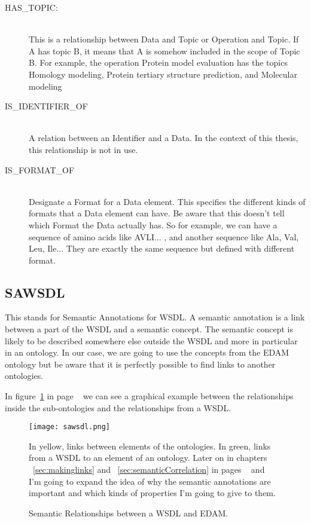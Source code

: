 \documentclass[a4paper,10pt]{article}
\begin{document}
\begin{description}
	\item[HAS\_TOPIC:] \hfill \\
	This is a relationship between Data and Topic or Operation and Topic. If A has topic B, it means that A is somehow included in the scope of Topic B. For example, the operation Protein model evaluation has the topics Homology modeling, Protein tertiary structure prediction, and Molecular modeling

	\item[IS\_IDENTIFIER\_OF] \hfill \\
	A relation between an Identifier and a Data. In the context of this thesis, this relationship is not in use.

	\item[IS\_FORMAT\_OF] \hfill \\
	Designate a Format for a Data element. This specifies the different kinds of formats that a Data element can have. Be aware that this doesn't tell which Format the Data actually has. So for example, we can have a sequence of amino acids like AVLI... , and another sequence like Ala, Val, Leu, Ile... They are exactly the same sequence but defined with different format.

    \end{description}


  \subsection{SAWSDL}
  \label{sec:sawsdl}
  
  This stands for Semantic Annotations for WSDL. A semantic annotation is a link between a part of the WSDL and a semantic concept. The semantic concept is likely to be described somewhere else outside the WSDL and more in particular in an ontology. In our case, we are going to use the concepts from the EDAM ontology but be aware that it is perfectly possible to find links to another ontologies.\vspace{3 mm}

  In figure~\ref{fig:sawsdlFigure} in page ~\pageref{fig:sawsdlFigure} we can see a graphical example between the relationships inside the sub-ontologies and the relationships from a WSDL.

	\begin{figure}[H]
	{\centering
	\texttt{[image: sawsdl.png]}
	\caption{Semantic Relationships between a WSDL and EDAM.} \label{fig:sawsdlFigure}}
	\medskip
	\small
	In yellow, links between elements of the ontologies. In green, links from a WSDL to an element of an ontology. Later on in chapters ~\ref{sec:makinglinks} and ~\ref{sec:semanticCorrelation} in pages ~\pageref{sec:makinglinks} and ~\pageref{sec:semanticCorrelation} I'm going to expand the idea of why the semantic annotations are important and which kinds of properties I'm going to give to them.
	\end{figure}
\end{document}
